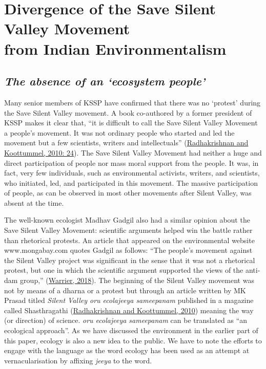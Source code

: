 \documentclass[twoside, 13pt]{article}
\begin{document}
{{{{\fontsize{18}{20}\selectfont\section*{Divergence of the Save Silent Valley Movement\\ from Indian Environmentalism}}

\vspace{-.3cm}

{\fontsize{8}{10}\selectfont \subsection*{\textit{The absence of an ‘ecosystem people’}}}

{\fontsize{12}{14}\selectfont Many senior members of KSSP have confirmed that there was no ‘protest’ during the Save Silent Valley movement. A book co-authored by a former president of KSSP makes it clear that, “it is difficult to call the Save Silent Valley Movement a people’s movement. It was not ordinary people who started and led the movement but a few scientists, writers and intellectuals” (\underline{Radhakrishnan and Koottummel, 2010: 24}). The Save Silent Valley Movement had neither a huge and direct participation of people nor mass moral support from the people. It was, in fact, very few individuals, such as environmental activists, writers, and scientists, who initiated, led, and participated in this movement. The massive participation of people, as can be observed in most other movements after Silent Valley, was absent at the time.


The well-known ecologist Madhav Gadgil also had a similar opinion about the Save Silent Valley Movement: scientific arguments helped win the battle rather than rhetorical protests. An article that appeared on the environmental website www.mongabay.com quotes Gadgil as follows: “The people’s movement against the Silent Valley project was significant in the sense that it was not a rhetorical protest, but one in which the scientific argument supported the views of the anti-dam group,” (\underline{Warrier, 2018}). The beginning of the Silent Valley movement was not by means of a dharna or a protest but through an article written by MK Prasad titled \textit{Silent Valley oru ecolajeeya sameepanam} published in a magazine called Shasthragathi (\underline{Radhakrishnan and Koottummel, 2010}) meaning the way (or direction) of science. \textit{oru ecolajeeya sameepanam} can be translated as “an ecological approach”. As we have discussed the environment in the earlier part of this paper, ecology is also a new idea to the public. We have to note the efforts to engage with the language as the word ecology has been used as an attempt at vernacularisation by affixing \textit{jeeya} to the word. 


}}}}
\end{document}
